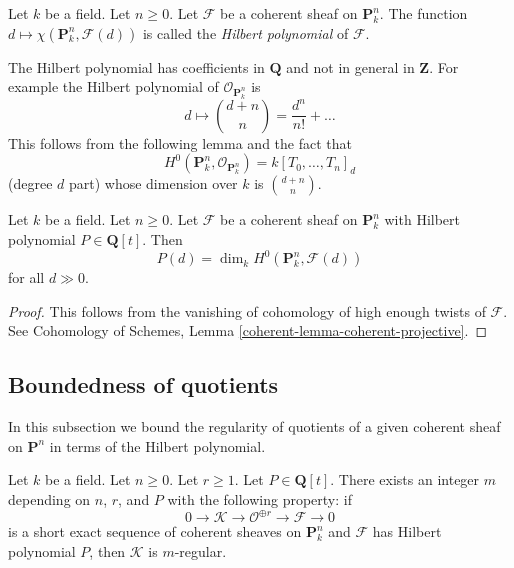 \begin{definition}
\label{definition-hilbert-polynomial}
Let $k$ be a field. Let $n \geq 0$. Let $\mathcal{F}$ be a coherent sheaf
on $\mathbf{P}^n_k$. The function
$d \mapsto \chi(\mathbf{P}^n_k, \mathcal{F}(d))$ is called the
{\it Hilbert polynomial} of $\mathcal{F}$.
\end{definition}

\noindent
The Hilbert polynomial has coefficients in $\mathbf{Q}$ and not
in general in $\mathbf{Z}$. For example the Hilbert polynomial
of $\mathcal{O}_{\mathbf{P}^n_k}$ is
$$
d \longmapsto {d + n \choose n} = \frac{d^n}{n!} + \ldots
$$
This follows from the following lemma and the fact that
$$
H^0(\mathbf{P}^n_k, \mathcal{O}_{\mathbf{P}^n_k}) = k[T_0, \ldots, T_n]_d
$$
(degree $d$ part) whose dimension over $k$ is ${d + n \choose n}$.

\begin{lemma}
\label{lemma-hilbert-polynomial-H0}
Let $k$ be a field. Let $n \geq 0$. Let $\mathcal{F}$ be a coherent sheaf
on $\mathbf{P}^n_k$ with Hilbert polynomial $P \in \mathbf{Q}[t]$.
Then
$$
P(d) = \dim_k H^0(\mathbf{P}^n_k, \mathcal{F}(d))
$$
for all $d \gg 0$.
\end{lemma}

\begin{proof}
This follows from the vanishing of cohomology of high enough twists
of $\mathcal{F}$. See
Cohomology of Schemes,
Lemma \ref{coherent-lemma-coherent-projective}.
\end{proof}



\subsection{Boundedness of quotients}
\label{subsection-boundedness}

\noindent
In this subsection we bound the regularity of quotients of
a given coherent sheaf on $\mathbf{P}^n$ in terms of the
Hilbert polynomial.

\begin{lemma}
\label{lemma-bound-quotients-free}
Let $k$ be a field. Let $n \geq 0$. Let $r \geq 1$. Let $P \in \mathbf{Q}[t]$.
There exists an integer $m$ depending on $n$, $r$, and $P$
with the following property: if
$$
0 \to \mathcal{K} \to \mathcal{O}^{\oplus r} \to \mathcal{F} \to 0
$$
is a short exact sequence of coherent sheaves on $\mathbf{P}^n_k$
and $\mathcal{F}$ has Hilbert polynomial $P$, then
$\mathcal{K}$ is $m$-regular.
\end{lemma}

